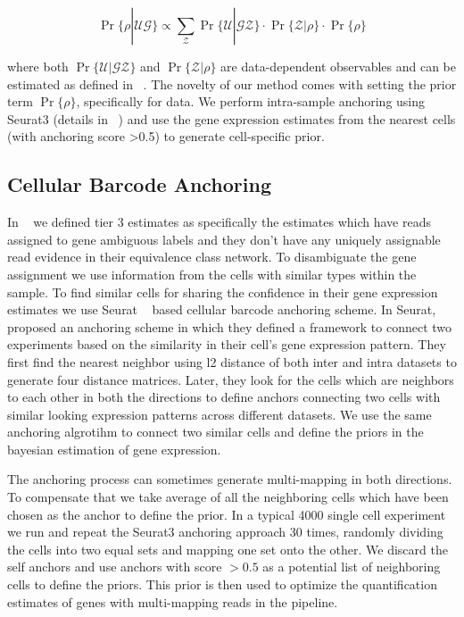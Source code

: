 \begin{equation}
    \Pr \{ \rho | \mathcal{U} \mathcal{G} \} 
    \propto \sum_{\mathcal{Z}} \Pr\{ \mathcal{U} | \mathcal{G} \mathcal{Z} \}
    \cdot \Pr\{ \mathcal{Z} | \rho \} \cdot \Pr\{ \rho \}
\end{equation}

where both $\Pr\{ \mathcal{U} | \mathcal{G} \mathcal{Z} \}$ and $\Pr\{ \mathcal{Z} | \rho \}$ are 
data-dependent observables and can be estimated as defined in ~\citet{salmon}. The novelty of our method
comes with setting the prior term $\Pr\{ \rho \}$, specifically for \dscrnaseq data. We perform
intra-sample anchoring using Seurat3 (details in ~) and use the gene expression
estimates from the nearest cells (with anchoring score >0.5) to generate cell-specific prior.

\subsection{Cellular Barcode Anchoring}
\label{subsec:anchor}
In ~ we defined tier 3 estimates as specifically the estimates which have reads assigned 
to gene ambiguous labels and they don't have any uniquely assignable read evidence in their equivalence 
class network. To disambiguate the gene assignment we use 
information from the cells with similar types within the sample. To find similar cells for sharing 
the confidence in their gene expression estimates we use Seurat ~\citep{seurat3} based cellular
barcode anchoring scheme. In Seurat, ~\citet{seurat3} proposed an anchoring scheme in which they 
defined a framework to connect two experiments based on the similarity in their cell's gene expression 
pattern. They first find the nearest neighbor using l2 distance of both inter and intra datasets to generate 
four distance matrices. Later, they look for the cells which are neighbors to each other in both 
the directions to define anchors connecting two cells with similar looking expression patterns 
across different \singlecell datasets. We use the same anchoring algrotihm to connect two similar 
cells and define the priors in the bayesian estimation of gene expression.

The anchoring process can sometimes generate multi-mapping in both directions. To compensate that we take average 
of all the neighboring cells which have been chosen as the anchor to define the prior. In a typical 4000 single 
cell experiment we run \alevin and repeat the Seurat3 anchoring approach $30$ times, randomly dividing 
the cells into two equal sets and mapping one set onto the other. We discard the self anchors and use 
anchors with score $>0.5$ as a potential list of neighboring cells to define the priors. This prior 
is then used to optimize the quantification estimates of genes with multi-mapping reads in the \alevin 
pipeline.

